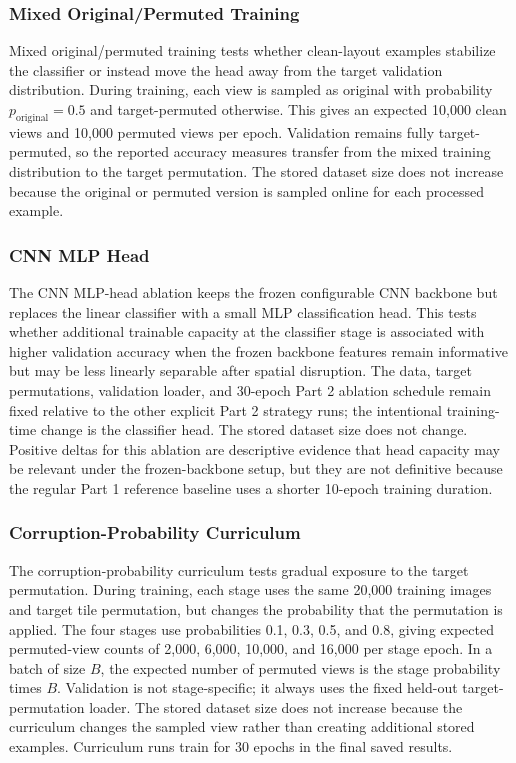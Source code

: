 \documentclass[12pt]{article}
\begin{document}
\subsubsection{Mixed Original/Permuted Training}

Mixed original/permuted training tests whether clean-layout examples stabilize the classifier or instead move the head away from the target validation distribution. During training, each view is sampled as original with probability $p_{\mathrm{original}}=0.5$ and target-permuted otherwise. This gives an expected 10,000 clean views and 10,000 permuted views per epoch. Validation remains fully target-permuted, so the reported accuracy measures transfer from the mixed training distribution to the target permutation. The stored dataset size does not increase because the original or permuted version is sampled online for each processed example.

\subsubsection{CNN MLP Head}

The CNN MLP-head ablation keeps the frozen configurable CNN backbone but replaces the linear classifier with a small MLP classification head. This tests whether additional trainable capacity at the classifier stage is associated with higher validation accuracy when the frozen backbone features remain informative but may be less linearly separable after spatial disruption. The data, target permutations, validation loader, and 30-epoch Part 2 ablation schedule remain fixed relative to the other explicit Part 2 strategy runs; the intentional training-time change is the classifier head. The stored dataset size does not change. Positive deltas for this ablation are descriptive evidence that head capacity may be relevant under the frozen-backbone setup, but they are not definitive because the regular Part 1 reference baseline uses a shorter 10-epoch training duration.

\subsubsection{Corruption-Probability Curriculum}

The corruption-probability curriculum tests gradual exposure to the target permutation. During training, each stage uses the same 20,000 training images and target tile permutation, but changes the probability that the permutation is applied. The four stages use probabilities 0.1, 0.3, 0.5, and 0.8, giving expected permuted-view counts of 2,000, 6,000, 10,000, and 16,000 per stage epoch. In a batch of size $B$, the expected number of permuted views is the stage probability times $B$. Validation is not stage-specific; it always uses the fixed held-out target-permutation loader. The stored dataset size does not increase because the curriculum changes the sampled view rather than creating additional stored examples. Curriculum runs train for 30 epochs in the final saved results.
\end{document}
